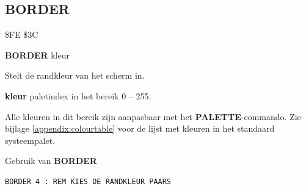 
\newpage
\subsection{BORDER}
\begin{description}[leftmargin=2cm,style=nextline]
\item [Token:]   \$FE \$3C

\item [Formaat:]  {\bf BORDER} kleur

\item [Gebruik:]   Stelt de randkleur van het scherm in.

{\bf kleur} paletindex in het bereik 0 -- 255.

                 Alle kleuren in dit bereik zijn aanpasbaar met het {\bf PALETTE}-commando. Zie bijlage \vref{appendix:colourtable} voor de lijst met kleuren in het standaard systeempalet.

\item [Voorbeeld:] Gebruik van {\bf BORDER}

\begin{tcolorbox}[colback=black,coltext=white]
\verbatimfont{\codefont}
\begin{verbatim}
BORDER 4 : REM KIES DE RANDKLEUR PAARS
\end{verbatim}
\end{tcolorbox}
\end{description}


\newpage
